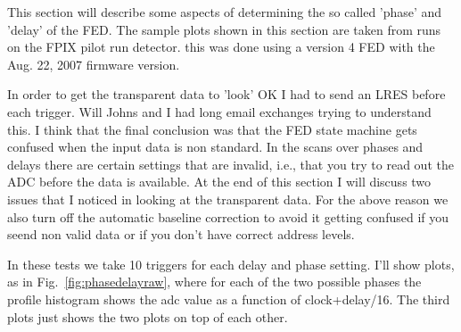 
This section will describe some aspects of determining the  so called 'phase' and 'delay' of the FED. The sample  plots shown in this section are taken from runs on the  FPIX pilot run detector. this was done using a version 4 FED with the Aug. 22, 2007 firmware version.

In order to get the transparent data to 'look' OK I had to send an LRES before each trigger. Will Johns and I had  long email exchanges trying to understand this. I think that the final conclusion was that the FED state machine gets confused when the input data is non standard. In the scans over phases and delays there are certain settings that are invalid, i.e., that you try to read out the ADC before the data is available. At the end of this section I will discuss two issues that I noticed in looking at the transparent data. 
For the above reason we also turn off the automatic baseline correction to avoid it getting confused if you seend non valid  data or if you don't have correct address levels.

In these tests we take 10 triggers for each delay and phase setting. I'll show plots, as in Fig.~\ref{fig:phasedelayraw}, where for each of the two possible phases the profile histogram shows the adc value as a function of clock+delay/16. The third plots just shows the two plots on top of each other.

